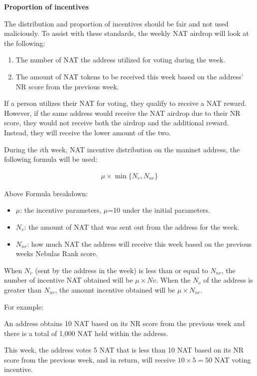 \vspace{2em}

\textbf{Proportion of incentives}

The distribution and proportion of incentives should be fair and not used maliciously. To assist with these standards, the weekly NAT airdrop will look at the following:

\begin{enumerate}
	\item The number of NAT the address utilized for voting during the week.
	\item The amount of NAT tokens to be received this week based on the address’ NR score from the previous week.
\end{enumerate}

If a person utilizes their NAT for voting, they qualify to receive a NAT reward. However, if the same address would receive the NAT airdrop due to their NR score, they would not receive both the airdrop and the additional reward. Instead, they will receive the lower amount of the two.
	
During the $i$th week, NAT incentive distribution on the maninet address, the following formula will be used:

\begin{align}
\mu\times \min\{N_{v},N_{nr}\}
\end{align}

Above Formula breakdown:

\begin{itemize}
	\item $\mu$: the incentive parameters, $\mu$=10 under the initial parameters.
	\item $N_{v}$: the amount of NAT that was sent out from the address for the week.
	\item $N_{nr}$: how much NAT the address will receive this week based on the previous weeks Nebulas Rank score.
\end{itemize}

When $N_{v}$ (sent by the address in the week) is less than or equal to $N_{nr}$, the number of incentive NAT obtained will be $\mu\times Nv$. When the $N_{v}$ of the address is greater than $N_{nr}$, the amount incentive obtained will be $\mu\times N_{nr}$.

For example:

An address obtains 10 NAT based on its NR score from the previous week and there is a total of 1,000 NAT held within the address.

This week, the address votes 5 NAT that is less than 10 NAT based on its NR score from the previous week, and in return, will receive $10\times5=50$ NAT voting incentive.

